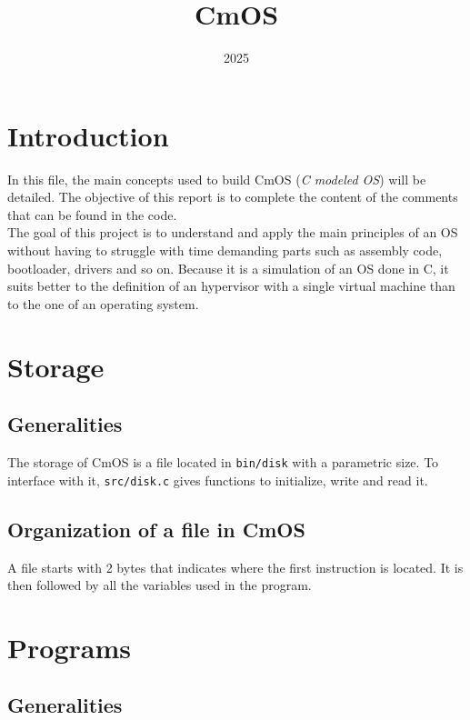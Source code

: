 \documentclass[a4paper,12pt]{article}
\title{CmOS}
\date{2025}
\begin{document}
\maketitle


\section{Introduction}

In this file, the main concepts used to build CmOS (\textit{C modeled OS}) will be detailed. The objective of this report is to complete the content of the comments that can be found in the code.\\
The goal of this project is to understand and apply the main principles of an OS without having to struggle with time demanding parts such as assembly code, bootloader, drivers and so on. Because it is a simulation of an OS done in C, it suits better to the definition of an hypervisor with a single virtual machine than to the one of an operating system.

\section{Storage}

\subsection{Generalities}

The storage of CmOS is a file located in \texttt{bin/disk} with a parametric size. To interface with it, \texttt{src/disk.c} gives functions to initialize, write and read it.

\subsection{Organization of a file in CmOS}

A file starts with 2 bytes that indicates where the first instruction is located. It is then followed by all the variables used in the program.

\section{Programs}

\subsection{Generalities}
\end{document}
